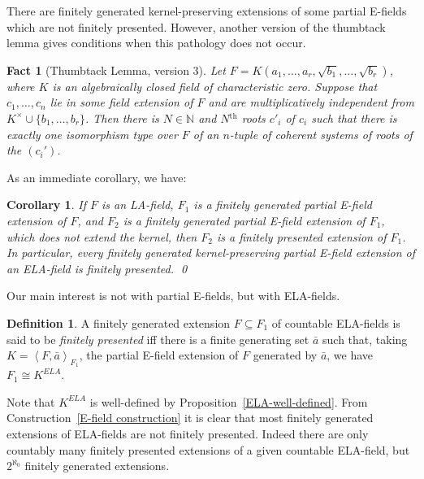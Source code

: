 \documentclass[12pt]{amsart}
\newtheorem{cor}[prop]{Corollary}
\newtheorem{fact}[prop]{Fact}
\theoremstyle{definition}
\newtheorem{defn}[prop]{Definition}
\begin{document}
There are finitely generated kernel-preserving extensions of some partial E-fields which are not finitely presented. However, another version of the thumbtack lemma gives conditions when this pathology does not occur.
\begin{fact}[Thumbtack Lemma, version 3]
  Let $F = K(a_1,\ldots,a_r,\sqrt{b_1},\ldots,\sqrt{b_r})$, where $K$ is an algebraically closed field of characteristic zero. Suppose that $c_1,\ldots,c_n$ lie in some field extension of $F$ and are multiplicatively independent from $K^{\ensuremath{\times}} \cup \{b_1,\ldots,b_r\}$. Then there is $N \in {\ensuremath{\mathbb{N}}}$ and $N{{\ensuremath{{}^{\mathrm{th}}}}}$ roots $c'_i$ of $c_i$ such that there is exactly one isomorphism type over $F$ of an $n$-tuple of coherent systems of roots of the $(c_i')$.
\end{fact}
As an immediate corollary, we have:
\begin{cor}\label{fg pE extensions are fp}
  If $F$ is an LA-field, $F_1$ is a finitely generated partial E-field
  extension of $F$, and $F_2$ is a finitely generated partial E-field
  extension of $F_1$, which does not extend the kernel, then $F_2$ is
  a finitely presented extension of $F_1$. In particular, every
  finitely generated kernel-preserving partial E-field extension of an
  ELA-field is finitely presented. \qed
\end{cor}

Our main interest is not with partial E-fields, but with ELA-fields. 
\begin{defn}
  A finitely generated extension $F {\subseteq} F_1$ of countable ELA-fields is said to be \emph{finitely presented} iff there is a finite generating set ${{\ensuremath{\bar{a}}}}$ such that, taking $K={\ensuremath{\left\langle {F,{{\ensuremath{\bar{a}}}}} \right\rangle}}_{F_1}$, the partial E-field extension of $F$ generated by ${{\ensuremath{\bar{a}}}}$, we have $F_1 {\cong} K^{ELA}$.
\end{defn}
Note that $K^{ELA}$ is well-defined by Proposition~\ref{ELA-well-defined}. From Construction~\ref{E-field construction} it is clear that most finitely generated extensions of ELA-fields are not finitely presented. Indeed there are only countably many finitely presented extensions of a given countable ELA-field, but $2^{\aleph_0}$ finitely generated extensions.
\end{document}
